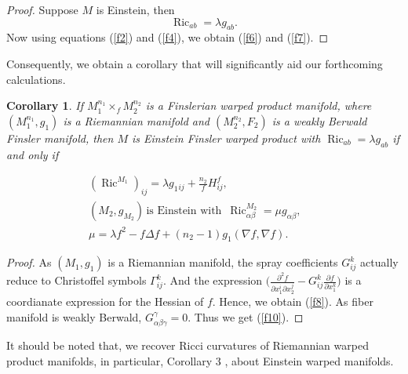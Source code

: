 \documentclass[pdflatex,sn-mathphys-num]{sn-jnl}%
\newtheorem{corollary}{Corollary}[section]
\theoremstyle{thmstyleone}%
\theoremstyle{thmstyletwo}%
\theoremstyle{thmstylethree}%
\begin{document}
	\begin{proof}
		Suppose $M$ is Einstein, then
		\begin{equation}\label{f122}
			\operatorname{Ric}_{ab}=\lambda g_{ab}.   
		\end{equation}
		Now using equations (\ref{f2}) and (\ref{f4}), we obtain  (\ref{f6}) and (\ref{f7}). 
	\end{proof}

 
\vspace{0.15in}

Consequently, we obtain  a corollary that will significantly aid  our forthcoming calculations.

 
	
	\begin{corollary}\label{f20}
		If $M_{1}^{n_1}\times_{f}M_{2}^{n_2}$ is a Finslerian warped product manifold,
  where $(M_{1}^{n_1},g_1)$ is a Riemannian manifold and $(M_2^{n_2},F_2)$ is a weakly Berwald Finsler manifold, then $M$ is Einstein Finsler warped product with $\operatorname{Ric}_{ab}=\lambda g_{ab}$ if and only if 

  
		\begin{align}
		(\operatorname{Ric}^{M_1})_{ij}=\lambda g_1{_{ij}}+\frac{{n_2}}{f}H_{ij}^f,\label{f8}&&\\
			 (M_2,g_{M_2})\,\text{is  Einstein with }\, \operatorname{Ric}_{\alpha\beta}^{M_2}=\mu g_{\alpha\beta},\label{f9}&&\\
		 \mu=\lambda f^2 - f \Delta f + (n_2-1)  g_1(\nabla f,\nabla f).\label{f10}
		\end{align}
  
\end{corollary}
	
	\begin{proof}
		As $(M_1, g_1)$ is a Riemannian manifold, the spray coefficients
		$G_{ij}^k$ actually reduce to Christoffel symbols  $\Gamma^{k}_{ij}$. And the expression 
		$\bigg(\frac{\partial^{2}f}{\partial x_1^i\partial x_2^j}-G_{ij}^k \frac{\partial f}{\partial x_1^k}\bigg)$ is a coordianate expression for 
		the Hessian of $f$. Hence, we obtain (\ref{f8}). As fiber manifold is weakly Berwald, $G_{\alpha\beta\gamma}^{\gamma}=0$. Thus we get (\ref{f10}).
	\end{proof}
	
	\vspace{0.15in}

 It should be noted that, we recover Ricci curvatures of Riemannian warped   product manifolds, in particular, Corollary 3 \cite{kim}, about Einstein warped manifolds.
	
\end{document}
